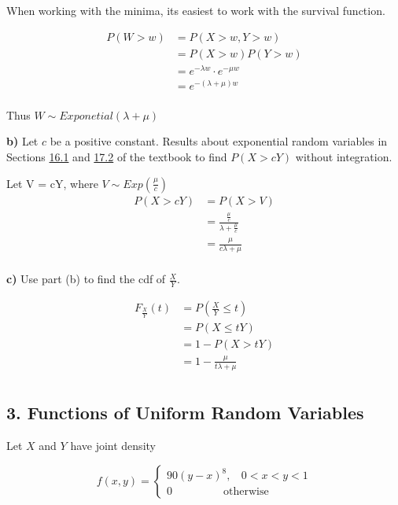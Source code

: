 \documentclass[11pt]{article}
\begin{document}
When working with the minima, its easiest to work with the survival function. 

\begin{align*}
	P(W > w) &= P(X > w, Y > w) \\
	&= P(X > w) P(Y> w) \\
	&= e^{-\lambda w} \cdot e^{-\mu w} \\
	&= e^{-(\lambda + \mu ) w} \\
\end{align*}

Thus $ W \sim Exponetial(\lambda + \mu )$ 

\textbf{b)} Let \(c\) be a positive constant. Results about exponential
random variables in Sections
\href{https://data140.org/textbook/content/chapter-16/linear-transformations/}{16.1}
and
\href{https://data140.org/textbook/content/chapter-17/independence/\#competing-exponentials}{17.2}
of the textbook to find \(P(X > cY)\) without integration.

Let V = cY, where $ V \sim Exp(\frac{\mu }{c}) $ 
\begin{align*}
	P(X > cY) &=  P(X > V) \\
	&=  \frac{\frac{\mu}{c}}{\lambda + \frac{\mu}{c}} \\
	&= \frac{\mu }{c\lambda + \mu } \\
\end{align*}



\textbf{c)} Use part (b) to find the cdf of \(\frac{X}{Y}\).

\begin{align*}
	F_{\frac{X}{Y}}(t) &= P(\frac{X}{Y} \le t ) \\
&= P(X \le tY) \\
&= 1 - P(X > tY) \\
&= 1 - \frac{\mu }{t \lambda + \mu } \\
\end{align*}


    \newpage

    \subsection{3. Functions of Uniform Random
Variables}\label{functions-of-uniform-random-variables}

Let \(X\) and \(Y\) have joint density

\[f(x, y) = 
\begin{cases}
90(y-x)^8, ~~~~ 0 < x < y < 1 \\
0 ~~~~~~~~~~~~~~~~~~~~~ \text{otherwise}
\end{cases}\]
\end{document}
